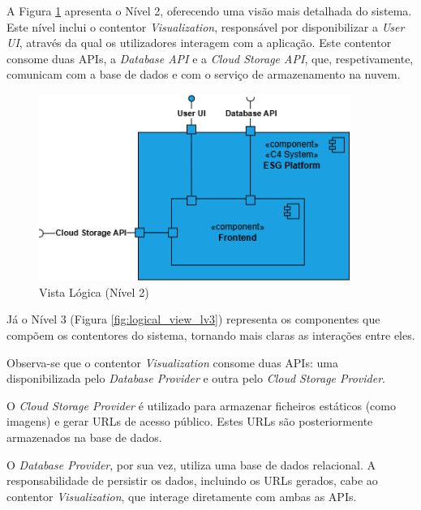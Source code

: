 A Figura \ref{fig:logical_view_lv2} apresenta o Nível 2, oferecendo uma visão mais detalhada do sistema. Este nível inclui o contentor \textit{Visualization}, responsável por disponibilizar a \textit{User UI}, através da qual os utilizadores interagem com a aplicação. Este contentor consome duas APIs, a \textit{Database API} e a \textit{Cloud Storage API}, que, respetivamente, comunicam com a base de dados e com o serviço de armazenamento na nuvem.

\begin{figure}[H]
    \centering
    \includegraphics[width=4in,keepaspectratio]{frontmatter/assets/diagrams/Logical View/Logical View Lv2.drawio.png}
    \caption{Vista Lógica (Nível 2)}
    \label{fig:logical_view_lv2}
\end{figure}

Já o Nível 3 (Figura \ref{fig:logical_view_lv3}) representa os componentes que compõem os contentores do sistema, tornando mais claras as interações entre eles.

Observa-se que o contentor \textit{Visualization} consome duas APIs: uma disponibilizada pelo \textit{Database Provider} e outra pelo \textit{Cloud Storage Provider}.

O \textit{Cloud Storage Provider} é utilizado para armazenar ficheiros estáticos (como imagens) e gerar URLs de acesso público. Estes URLs são posteriormente armazenados na base de dados.

O \textit{Database Provider}, por sua vez, utiliza uma base de dados relacional. A responsabilidade de persistir os dados, incluindo os URLs gerados, cabe ao contentor \textit{Visualization}, que interage diretamente com ambas as APIs.

